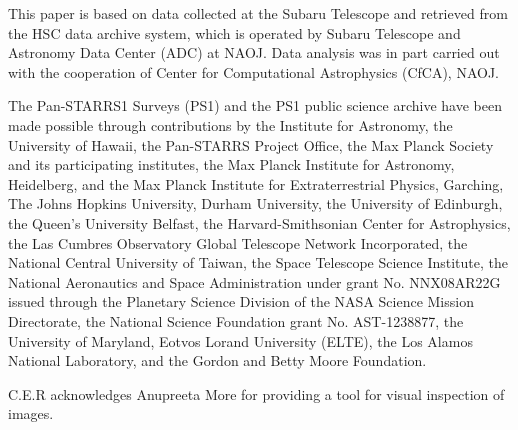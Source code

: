 \documentclass[a4paper,fleqn,usenatbib]{mnras}
\begin{document}
This paper is based on data collected at the Subaru Telescope and retrieved from the HSC data archive system, which is operated by Subaru Telescope and Astronomy Data Center (ADC) at NAOJ. 
Data analysis was in part carried out with the cooperation of Center for Computational Astrophysics (CfCA), NAOJ.
 
The Pan-STARRS1 Surveys (PS1) and the PS1 public science archive have been made possible through contributions by the Institute for Astronomy, the University of Hawaii, the Pan-STARRS Project Office, the Max Planck Society and its participating institutes, the Max Planck Institute for Astronomy, Heidelberg, and the Max Planck Institute for Extraterrestrial Physics, Garching, The Johns Hopkins University, Durham University, the University of Edinburgh, the Queen’s University Belfast, the Harvard-Smithsonian Center for Astrophysics, the Las Cumbres Observatory Global Telescope Network Incorporated, the National Central University of Taiwan, the Space Telescope Science Institute, the National Aeronautics and Space Administration under grant No. NNX08AR22G issued through the Planetary Science Division of the NASA Science Mission Directorate, the National Science Foundation grant No. AST-1238877, the University of Maryland, Eotvos Lorand University (ELTE), the Los Alamos National Laboratory, and the Gordon and Betty Moore Foundation.

C.E.R acknowledges Anupreeta More for providing a tool for visual inspection of images.





%


\end{document}
